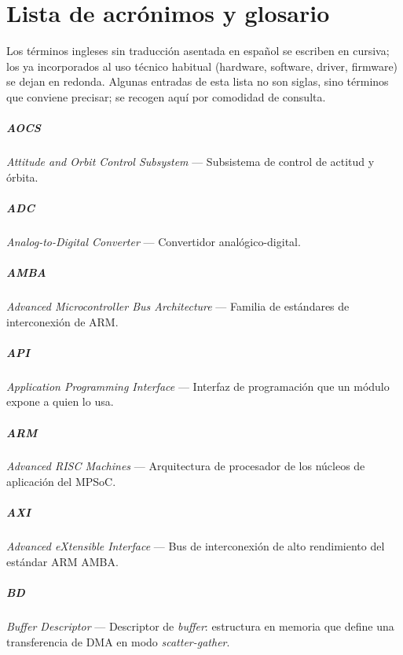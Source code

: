 \chapter{Lista de acrónimos y glosario}

Los términos ingleses sin traducción asentada en español se escriben en cursiva; los ya
incorporados al uso técnico habitual (hardware, software, driver, firmware) se dejan en redonda.
Algunas entradas de esta lista no son siglas, sino términos que conviene precisar; se recogen
aquí por comodidad de consulta.

\paragraph{AOCS} \textit{Attitude and Orbit Control Subsystem} --- Subsistema de control de actitud y órbita.

\paragraph{ADC} \textit{Analog-to-Digital Converter} --- Convertidor analógico-digital.

\paragraph{AMBA} \textit{Advanced Microcontroller Bus Architecture} --- Familia de estándares de interconexión de ARM.

\paragraph{API} \textit{Application Programming Interface} --- Interfaz de programación que un módulo expone a quien lo usa.

\paragraph{ARM} \textit{Advanced RISC Machines} --- Arquitectura de procesador de los núcleos de aplicación del MPSoC.

\paragraph{AXI} \textit{Advanced eXtensible Interface} --- Bus de interconexión de alto rendimiento del estándar ARM AMBA.

\paragraph{BD} \textit{Buffer Descriptor} --- Descriptor de \textit{buffer}: estructura en memoria que define una transferencia de DMA en modo \textit{scatter-gather}.

